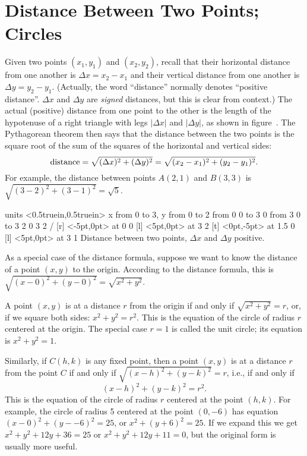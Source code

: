\section{Distance Between Two Points; Circles}{}{}

Given two points $(x_1,y_1)$ and $(x_2,y_2)$, recall that their
horizontal distance from one another is $\Delta x=x_2-x_1$ and their
vertical distance from one another is $\Delta y=y_2-y_1$.  (Actually,
the word ``distance'' normally denotes ``positive distance''. $\Delta
x$ and $\Delta y$ are {\it signed\/} distances, but this is clear from
context.)  The actual (positive) distance from one point to the other
is the length of the hypotenuse of a right triangle with legs $|\Delta
x|$ and $|\Delta y|$, as shown in figure~.  The Pythagorean theorem then says that the distance between
the two points is the square root of the sum of the squares of the
horizontal and vertical sides:
$$
  \hbox{distance}
    =\sqrt{(\Delta x)^2+(\Delta y)^2}=\sqrt{(x_2-x_1)^2+ (y_2-y_1)^2}.
$$
For example, the distance between points $A(2,1)$ and $B(3,3)$ is
$\sqrt{(3-2)^2+(3-1)^2}=\sqrt{5}$.

\figure
\texonly
\vbox{\beginpicture
\normalgraphs
\ninepoint
\setcoordinatesystem units <0.5truein,0.5truein>
\setplotarea x from 0 to 3, y from 0 to 2
\putrule from 0 0 to 3 0
\putrule from 3 0 to 3 2
 0 3 2 /
 [r] <-5pt,0pt> at 0 0
 [l] <5pt,0pt> at 3 2
 [t] <0pt,-5pt> at 1.5 0
 [l] <5pt,0pt> at 3 1
\endpicture}
\endtexonly
{}
\begincaption
Distance between two points, $\Delta x$ and $\Delta y$ positive.
\endcaption
\endfigure

As a special case of the distance formula, suppose we want to know the
distance of a point $(x,y)$ to the origin.  According to the distance
formula, this is $\sqrt{(x-0)^2+(y-0)^2}=\sqrt{x^2+y^2}$.

A point $(x,y)$ is at a distance $r$ from the origin if and only if
$\sqrt{x^2+y^2}=r$, or, if we square both sides: $x^2+y^2=r^2$.  This is
the equation of the circle 
of radius $r$ centered at the origin.
The special case $r=1$ is called the unit 
circle; 
its equation is
$x^2+y^2=1$.

Similarly, if $C(h,k)$ is any fixed point, then a point $(x,y)$ is at a
distance $r$ from the point $C$ if and only if $\sqrt{(x-h)^2+(y-k)^2}=r$,
i.e., if and only if 
$$
(x-h)^2+(y-k)^2=r^2.
$$
This is the equation of the circle 
of radius $r$ centered at the
point $(h,k)$.  For example, the circle of radius 5 centered at the
point $(0,-6)$ has equation $(x-0)^2+(y--6)^2=25$, or
$x^2+(y+6)^2=25$.  If we
expand this we get $x^2+y^2+12y+36=25$ or 
$x^2+y^2+12y+11=0$, but the original form is usually more useful.

